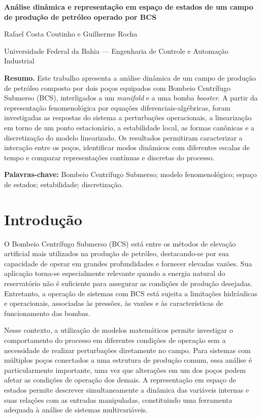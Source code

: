 \documentclass[10pt,a4paper]{article}
\begin{document}
\begin{center}
{\Large\bfseries Análise dinâmica e representação em espaço de estados de um campo de produção de petróleo operado por BCS\par}
\vspace{4pt}
{\normalsize Rafael Costa Coutinho e Guilherme Rocha}\par
{\small Universidade Federal da Bahia --- Engenharia de Controle e Automação Industrial}\par
\vspace{5pt}
\end{center}

\noindent\textbf{Resumo.} Este trabalho apresenta a análise dinâmica de um campo de produção de petróleo composto por dois poços equipados com Bombeio Centrífugo Submerso (BCS), interligados a um \textit{manifold} e a uma bomba \textit{booster}. A partir da representação fenomenológica por equações diferenciais-algébricas, foram investigadas as respostas do sistema a perturbações operacionais, a linearização em torno de um ponto estacionário, a estabilidade local, as formas canônicas e a discretização do modelo linearizado. Os resultados permitiram caracterizar a interação entre os poços, identificar modos dinâmicos com diferentes escalas de tempo e comparar representações contínuas e discretas do processo.\par
\noindent\textbf{Palavras-chave:} Bombeio Centrífugo Submerso; modelo fenomenológico; espaço de estados; estabilidade; discretização.

\section{Introdução}
O Bombeio Centrífugo Submerso (BCS) está entre os métodos de elevação artificial mais utilizados na produção de petróleo, destacando-se por sua capacidade de operar em grandes profundidades e fornecer elevadas vazões. Sua aplicação torna-se especialmente relevante quando a energia natural do reservatório não é suficiente para assegurar as condições de produção desejadas. Entretanto, a operação de sistemas com BCS está sujeita a limitações hidráulicas e operacionais, associadas às pressões, às vazões e às características de funcionamento das bombas.

Nesse contexto, a utilização de modelos matemáticos permite investigar o comportamento do processo em diferentes condições de operação sem a necessidade de realizar perturbações diretamente no campo. Para sistemas com múltiplos poços conectados a uma estrutura de produção comum, essa análise é particularmente importante, uma vez que alterações em um dos poços podem afetar as condições de operação dos demais. A representação em espaço de estados permite descrever simultaneamente a dinâmica das variáveis internas e suas relações com as entradas manipuladas, constituindo uma ferramenta adequada à análise de sistemas multivariáveis.
\end{document}
